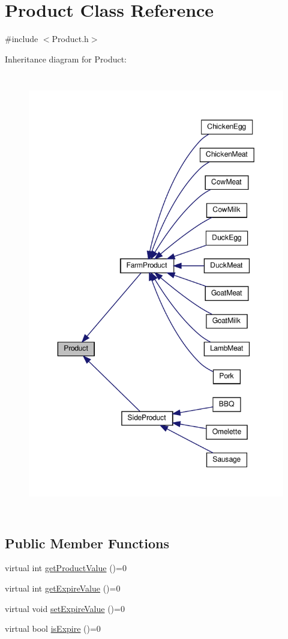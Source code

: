 \hypertarget{classProduct}{}\section{Product Class Reference}
\label{classProduct}


{\ttfamily \#include $<$Product.\+h$>$}



Inheritance diagram for Product\+:
\nopagebreak
\begin{figure}[H]
\begin{center}
\leavevmode
\includegraphics[height=550pt]{classProduct__inherit__graph}
\end{center}
\end{figure}
\subsection*{Public Member Functions}
\begin{DoxyCompactItemize}
\item 
virtual int \hyperlink{classProduct_a5c56d625cae28f43b626578ac4611e43}{get\+Product\+Value} ()=0
\item 
virtual int \hyperlink{classProduct_a739031c520fb9e376da3d3fc2955c7e7}{get\+Expire\+Value} ()=0
\item 
virtual void \hyperlink{classProduct_a84aba139efc9cbcb05d47de168645463}{set\+Expire\+Value} ()=0
\item 
virtual bool \hyperlink{classProduct_aec86d25d77417014f8780ea65416bac7}{is\+Expire} ()=0
\end{DoxyCompactItemize}
